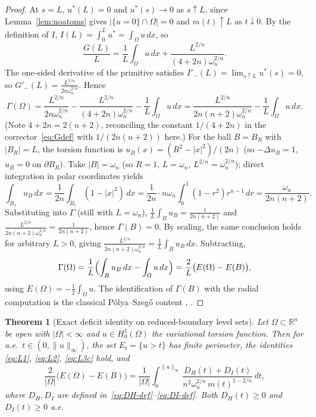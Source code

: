 \documentclass[11pt]{article}
\newtheorem{theorem}{Theorem}[section]
\theoremstyle{definition}
\newcommand{\R}{\mathbb{R}}
\newcommand{\Om}{\Omega}
\begin{document}
\begin{proof}
At $s=L$, $u^{*}(L)=0$ and $u^*(s)\to0$ as $s\uparrow L$, since
Lemma~\ref{lem:noatoms} gives $|\{u=0\}\cap\Om|=0$ and
$m(t)\uparrow L$ as $t\downarrow0$. By the definition of $I$,
$I(L)=\int_{0}^{L}u^{*}=\int_{\Om}u\,dx$, so
\[
   \frac{G(L)}{L}=\frac{1}{L}\int_{\Om}u\,dx
                  +\frac{L^{2/n}}{(4+2n)\omega_{n}^{2/n}}.
\]
The one-sided derivative of the primitive satisfies
$I'_{-}(L)=\lim_{s\uparrow L}u^*(s)=0$, so
$G'_{-}(L)=
\frac{L^{2/n}}{2n\omega_{n}^{2/n}}$. Hence
\[
   \Gamma(\Om)
   =\frac{L^{2/n}}{2n\omega_{n}^{2/n}}
    -\frac{L^{2/n}}{(4+2n)\omega_{n}^{2/n}}
    -\frac{1}{L}\int_{\Om}u\,dx
   =\frac{L^{2/n}}{2n(n+2)\omega_{n}^{2/n}}-\frac{1}{L}\int_{\Om}u\,dx.
\]
(Note $4+2n=2(n+2)$, reconciling the constant $1/(4+2n)$ in the
corrector~\eqref{eq:Gdef} with $1/(2n(n+2))$ here.)
For the ball $B=B_{R}$ with $|B_{R}|=L$, the torsion function is
$u_{B}(x)=(R^{2}-|x|^{2})/(2n)$ (so $-\Delta u_{B}=1$, $u_{B}=0$ on
$\partial B_{R}$). Take $|B|=\omega_{n}$ (so $R=1$, $L=\omega_{n}$,
$L^{2/n}=\omega_{n}^{2/n}$); direct integration in polar coordinates
yields
\[
   \int_{B_{1}}u_{B}\,dx
   =\frac{1}{2n}\int_{B_{1}}(1-|x|^{2})\,dx
   =\frac{1}{2n}\cdot n\omega_{n}\int_{0}^{1}(1-r^{2})r^{n-1}\,dr
   =\frac{\omega_{n}}{2n(n+2)}.
\]
Substituting into $\Gamma$ (still with $L=\omega_{n}$),
$\frac{1}{L}\int_{B}u_{B}=\frac{1}{2n(n+2)}$ and
$\frac{L^{2/n}}{2n(n+2)\omega_{n}^{2/n}}=\frac{1}{2n(n+2)}$, hence
$\Gamma(B)=0$. By scaling, the same conclusion holds for arbitrary
$L>0$, giving
$\frac{L^{2/n}}{2n(n+2)\omega_{n}^{2/n}}=\frac{1}{L}\int_{B}u_{B}\,dx$.
Subtracting,
\[
   \Gamma(\Om)
   =\frac{1}{L}\Bigl(\int_{B}u_{B}\,dx-\int_{\Om}u\,dx\Bigr)
   =\frac{2}{L}\bigl(E(\Om)-E(B)\bigr),
\]
using $E(\Om)=-\tfrac12\int_{\Om}u$. The identification of $\Gamma(B)$
with the radial computation is the classical P\'olya--Szeg\H{o} content
\cite{PolyaSzego1951}, \cite[\S II.5]{Bandle1980}.
\end{proof}

\begin{theorem}[Exact deficit identity on reduced-boundary level sets]
\label{thm:main}
Let $\Om\subset\R^{n}$ be open with $|\Om|<\infty$ and $u\in H^{1}_{0}(\Om)$
the variational torsion function. Then for a.e.\ $t\in(0,\|u\|_{\infty})$,
the set $E_{t}=\{u>t\}$ has finite perimeter, the identities
\eqref{eq:L1}, \eqref{eq:L2}, \eqref{eq:L3c} hold, and
\begin{equation}\label{eq:main}
   \boxed{\;
   \frac{2}{|\Om|}\bigl(E(\Om)-E(B)\bigr)
   =\frac{1}{|\Om|}\int_{0}^{\|u\|_{\infty}}
     \frac{D_{H}(t)+D_{I}(t)}{n^{2}\omega_{n}^{2/n}\,m(t)^{1-2/n}}\,dt,\;}
\end{equation}
where $D_{H},D_{I}$ are defined in~\eqref{eq:DH-def}--\eqref{eq:DI-def}.
Both $D_{H}(t)\ge 0$ and $D_{I}(t)\ge 0$ a.e.
\end{theorem}
\end{document}
